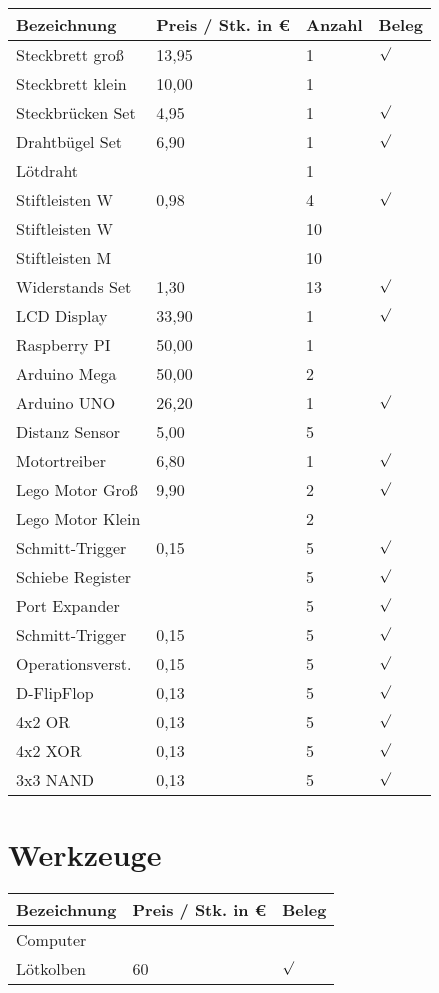 \documentclass[11pt]{report}
\begin{document}
\begin{tabular}{llll}
Bezeichnung & Preis / Stk. in \euro & Anzahl & Beleg \\
\hline
Steckbrett groß	& 13,95	& 1		& $\surd$ \\
Steckbrett klein	& 10,00	& 1		& \\
Steckbrücken Set	& 4,95	& 1		& $\surd$ \\
Drahtbügel Set	& 6,90	& 1		& $\surd$ \\
Lötdraht			&		& 1		& \\
Stiftleisten W		& 0,98	& 4		& $\surd$ \\
Stiftleisten W		&		& 10 	& \\
Stiftleisten M		&		& 10	& \\
Widerstands Set	& 1,30	& 13	& $\surd$ \\
LCD Display		& 33,90	& 1		& $\surd$ \\
Raspberry PI		& 50,00	& 1		& \\
Arduino Mega	& 50,00	& 2		& \\
Arduino UNO		& 26,20	& 1		& $\surd$ \\
Distanz Sensor	& 5,00	& 5 		& \\
Motortreiber		& 6,80	& 1		& $\surd$ \\
Lego Motor Groß	& 9,90	& 2		& $\surd$ \\
Lego Motor Klein	&		& 2		& \\
Schmitt-Trigger	& 0,15	& 5		& $\surd$ \\
Schiebe Register	&		& 5		& $\surd$ \\
Port Expander	&		& 5		& $\surd$ \\
Schmitt-Trigger	& 0,15	& 5		& $\surd$ \\
Operationsverst.	& 0,15	& 5		& $\surd$ \\
D-FlipFlop		& 0,13	& 5		& $\surd$ \\
4x2 OR			& 0,13	& 5		& $\surd$ \\
4x2 XOR			& 0,13	& 5		& $\surd$ \\
3x3 NAND		& 0,13	& 5		& $\surd$ \\
\end{tabular}


\section{Werkzeuge}
\begin{tabular}{lll}
Bezeichnung & Preis / Stk. in \euro & Beleg \\
\hline
Computer & & \\
Lötkolben & 60 & $\surd$  \\
\end{tabular}
\end{document}
